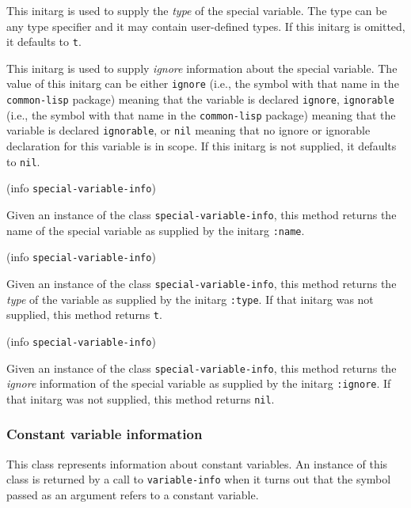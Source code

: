This initarg is used to supply the \emph{type} of the special
variable.  The type can be any type specifier and it may contain
user-defined types.  If this initarg is omitted, it defaults to
\texttt{t}. 


This initarg is used to supply \emph{ignore} information about the
special variable.  The value of this initarg can be either
\texttt{ignore} (i.e., the symbol with that name in the
\texttt{common-lisp} package) meaning that the variable is declared
\texttt{ignore}, \texttt{ignorable} (i.e., the symbol with that name
in the \texttt{common-lisp} package) meaning that the variable is
declared \texttt{ignorable}, or \texttt{nil} meaning that no ignore or
ignorable declaration for this variable is in scope.  If this initarg
is not supplied, it defaults to \texttt{nil}.

 {(info {\tt special-variable-info})}

Given an instance of the class \texttt{special-variable-info}, this
method returns the name of the special variable as supplied by the
initarg \texttt{:name}.

 {(info {\tt special-variable-info})}

Given an instance of the class \texttt{special-variable-info}, this
method returns the \emph{type} of the variable as supplied by the
initarg \texttt{:type}.  If that initarg was not supplied, this method
returns \texttt{t}.

 {(info {\tt special-variable-info})}

Given an instance of the class \texttt{special-variable-info}, this
method returns the \emph{ignore} information of the special variable as
supplied by the initarg \texttt{:ignore}.  If that initarg was not
supplied, this method returns \texttt{nil}.

\subsubsection{Constant variable information}


This class represents information about constant variables.   An
instance of this class is returned by a call to \texttt{variable-info}
when it turns out that the symbol passed as an argument refers to a
constant variable.


